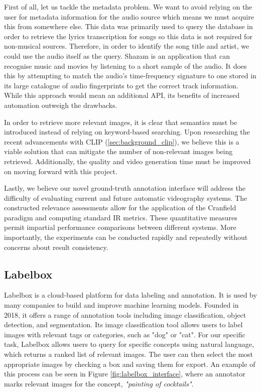\documentclass{l4proj}
\begin{document}
First of all, let us tackle the metadata problem. We want to avoid relying on the user for metadata information for the audio source which means we must acquire this from somewhere else. This data was primarily used to query the \cite{genius} database in order to retrieve the lyrics transcription for songs so this data is not required for non-musical sources. Therefore, in order to identify the song title and artist, we could use the audio itself as the query. Shazam \citep{wang2006shazam} is an application that can recognise music and movies by listening to a short sample of the audio. It does this by attempting to match the audio's time-frequency signature to one stored in its large catalogue of audio fingerprints to get the correct track information. While this approach would mean an additional API, its benefits of increased automation outweigh the drawbacks.

In order to retrieve more relevant images, it is clear that semantics must be introduced instead of relying on keyword-based searching. Upon researching the recent advancements with CLIP (\ref{sec:background_clip}), we believe this is a viable solution that can mitigate the number of non-relevant images being retrieved. Additionally, the quality and video generation time must be improved on moving forward with this project.

Lastly, we believe our novel ground-truth annotation interface will address the difficulty of evaluating current and future automatic videography systems. The constructed relevance assessments allow for the application of the Cranfield paradigm and computing standard IR metrics. These quantitative measures permit impartial performance comparisons between different systems. More importantly, the experiments can be conducted rapidly and repeatedly without concerns about result consistency.

\subsection{Labelbox}
\label{sec:labelbox}
Labelbox is a cloud-based platform for data labeling and annotation. It is used by many companies to build and improve machine learning models. Founded in 2018, it offers a range of annotation tools including image classification, object detection, and segmentation. Its image classification tool allows users to label images with relevant tags or categories, such as "dog" or "cat". For our specific task, Labelbox allows users to query for specific concepts using natural language, which returns a ranked list of relevant images. The user can then select the most appropriate images by checking a box and saving them for export. An example of this process can be seen in Figure \ref{fig:labelbox_interface}, where an annotator marks relevant images for the concept, \emph{"painting of cocktails"}.
\end{document}

